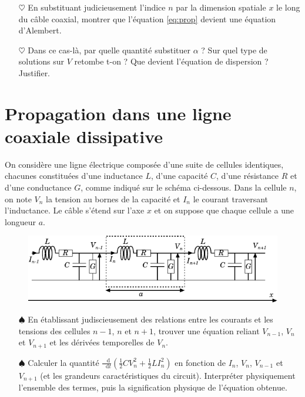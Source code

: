 \documentclass{report}
\newcommand*\dif{\mathop{}\!\mathrm{d}}
\begin{document}
\begin{itemize}

	\item[$\heartsuit$] En substituant judicieusement l'indice $n$ par la dimension spatiale $x$ le long du câble coaxial, montrer que l'équation \ref{eq:prop} devient une équation d'Alembert.
	
	\item[$\heartsuit$] Dans ce cas-là, par quelle quantité substituer $\alpha$ ? Sur quel type de solutions sur $V$ retombe t-on ? Que devient l'équation de dispersion ? Justifier. 

\end{itemize}

\newpage

\section*{Propagation dans une ligne coaxiale dissipative}

On considère une ligne électrique composée d'une suite de cellules identiques, chacunes constituées d'une inductance $L$, d'une capacité $C$, d'une résistance $R$ et d'une conductance $G$, comme indiqué sur le schéma ci-dessous. Dans la cellule $n$, on note $V_n$ la tension au bornes de la capacité et $I_n$ le courant traversant l'inductance. Le câble s'étend sur l'axe $x$ et on suppose que chaque cellule a une longueur $a$.

\begin{figure}[h!]
\centering
	\includegraphics[scale=1.5]{onde3_bis.pdf}
\end{figure}

\begin{itemize}

	\item[$\spadesuit$] En établissant judiscieusement des relations entre les courants et les tensions des cellules $n-1$, $n$ et $n+1$, trouver une équation reliant $V_{n-1}$, $V_{n}$ et $V_{n+1}$ et les dérivées temporelles de $V_n$.
	
	 \item[$\spadesuit$] Calculer la quantité $\frac{\dif}{\dif t}\left( \frac{1}{2}CV_n^2 + \frac{1}{2}LI_n^2 \right)$ en fonction de $I_n$, $V_n$, $V_{n-1}$ et $V_{n+1}$ (et les grandeurs caractéristiques du circuit). Interpréter physiquement l'ensemble des termes, puis la signification physique de l'équation obtenue. 

\end{itemize}
\end{document}
